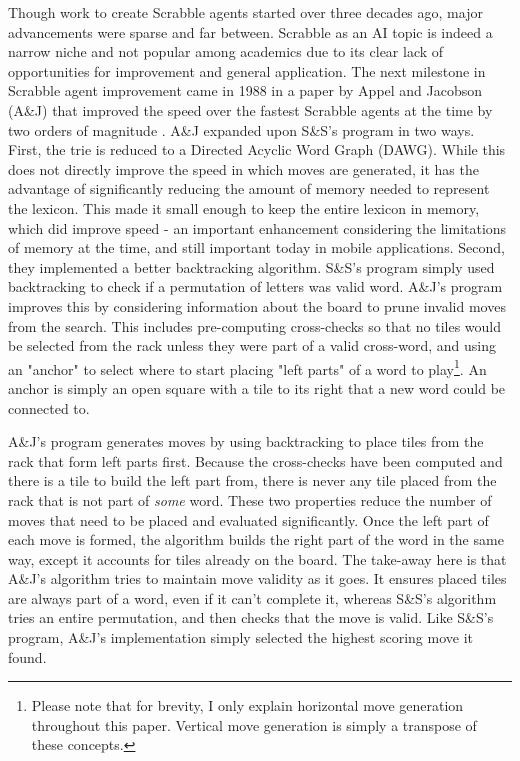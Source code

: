 \documentclass[letterpaper]{article}
\begin{document}
Though work to create Scrabble agents started over three decades ago, major advancements were sparse and far between. Scrabble as an AI topic is indeed a narrow niche and not popular among academics due to its clear lack of opportunities for improvement and general application. The next milestone in Scrabble agent improvement came in 1988 in a paper by Appel and Jacobson (A\&J) that improved the speed over the fastest Scrabble agents at the time by two orders of magnitude \cite{Appel1988}. A\&J expanded upon S\&S's program in two ways. First, the trie is reduced to a Directed Acyclic Word Graph (DAWG). While this does not directly improve the speed in which moves are generated, it has the advantage of significantly reducing the amount of memory needed to represent the lexicon. This made it small enough to keep the entire lexicon in memory, which did improve speed - an important enhancement considering the limitations of memory at the time, and still important today in mobile applications. Second, they implemented a better backtracking algorithm. S\&S's program simply used backtracking to check if a permutation of letters was valid word. A\&J's program improves this by considering information about the board to prune invalid moves from the search. This includes pre-computing cross-checks so that no tiles would be selected from the rack unless they were part of a valid cross-word, and using an "anchor" to select where to start placing "left parts" of a word to play\footnote{Please note that for brevity, I only explain horizontal move generation throughout this paper. Vertical move generation is simply a transpose of these concepts.}. An anchor is simply an open square with a tile to its right that a new word could be connected to.

A\&J's program generates moves by using backtracking to place tiles from the rack that form left parts first. Because the cross-checks have been computed and there is a tile to build the left part from, there is never any tile placed from the rack that is not part of \emph{some} word. These two properties reduce the number of moves that need to be placed and evaluated significantly. Once the left part of each move is formed, the algorithm builds the right part of the word in the same way, except it accounts for tiles already on the board. The take-away here is that A\&J's algorithm tries to maintain move validity as it goes. It ensures placed tiles are always part of a word, even if it can't complete it, whereas S\&S's algorithm tries an entire permutation, and then checks that the move is valid. Like S\&S's program, A\&J's implementation simply selected the highest scoring move it found.
\end{document}
